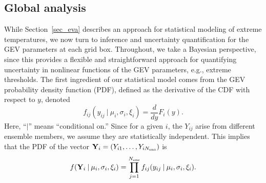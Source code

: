\documentclass{article}
\begin{document}

\subsection{Global analysis} \label{sec_global}

While Section~\ref{sec_eva} describes an approach for statistical modeling of extreme temperatures, we now turn to inference and uncertainty quantification for the GEV parameters at each grid box. Throughout, we take a Bayesian perspective, since this provides a flexible and straightforward approach for quantifying uncertainty in nonlinear functions of the GEV parameters, e.g., extreme thresholds.
The first ingredient of our statistical model comes from the GEV probability density function (PDF), defined as the derivative of the CDF with respect to $y$, denoted
\[
f_{ij}(y_{ij} \> | \> \mu_i, \sigma_i, \xi_i) = \frac{d}{dy} F_i(y).
\]
Here, ``$|$'' means ``conditional on.'' Since for a given $i$, the $Y_{ij}$ arise from different ensemble members, we assume they are statistically independent. This implies that the PDF of the vector ${\bf Y}_i = (Y_{i1}, \dots, Y_{iN_\text{ens}})$ is
\begin{equation} \label{eq:loglik}
   f( {\bf Y}_i \> | \> \mu_i, \sigma_i, \xi_i ) = \prod_{j=1}^{N_\text{ens}} f_{ij}(y_{ij} \> | \> \mu_i, \sigma_i, \xi_i). 
\end{equation}
\end{document}
